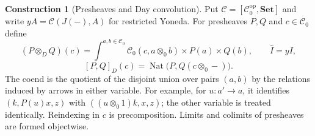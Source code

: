 \documentclass[11pt,a4paper]{article}
\numberwithin{equation}{section}
\theoremstyle{definition}
\newtheorem{construction}[construction]{Construction}
\theoremstyle{remark}
\theoremstyle{plain}
\begin{document}
\begin{construction}[Presheaves and Day convolution]
\label{con:egt-day-completion}
Put $\widehat{\mathcal C}=[\mathcal C_0^{\mathrm{op}},\mathbf{Set}]$ and
write $yA=\mathcal C(J(-),A)$ for restricted Yoneda. For presheaves
$P,Q$ and $c\in\mathcal C_0$ define
\[
 (P\otimes_D Q)(c)=
 \int^{a,b\in\mathcal C_0}\mathcal C_0(c,a\otimes_0 b)\times P(a)\times Q(b),
 \qquad \widehat I=yI,
\]
\[
 [P,Q]_D(c)=\operatorname{Nat}\bigl(P,Q(c\otimes_0-)\bigr).
\]
The coend is the quotient of the disjoint union over pairs $(a,b)$ by
the relations induced by arrows in either variable. For example, for
$u:a'\to a$, it identifies $(k,P(u)x,z)$ with
$((u\otimes_0 1)k,x,z)$; the other variable is treated identically.
Reindexing in $c$ is precomposition. Limits and colimits of presheaves
are formed objectwise.
\end{construction}
\end{document}
